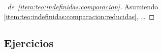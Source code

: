 \begin{proof}[\proofname~de~\eqref{item:teo:indefinidas:comparacion}]
	Asumiendo \eqref{item:teo:indefinidas:comparacion:reducidas},
	\dots
\end{proof}

\subsection*{Ejercicios}


